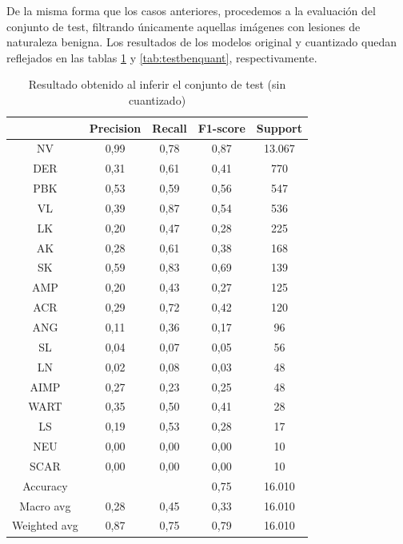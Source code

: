 De la misma forma que los casos anteriores, procedemos a la evaluación del conjunto de test, filtrando únicamente aquellas imágenes con lesiones de naturaleza benigna. Los resultados de los modelos original y cuantizado quedan reflejados en las tablas \ref{tab:testbenorig} y \ref{tab:testbenquant}, respectivamente.

\begin{table}[!ht]
	\centering
	\begin{tabular}{|c|c|c|c|c|}
		\hline
		~ & Precision & Recall & F1-score & Support \\ \hline
		NV & 0,99 & 0,78 & 0,87 & 13.067 \\ 
		DER & 0,31 & 0,61 & 0,41 & 770 \\ 
		PBK & 0,53 & 0,59 & 0,56 & 547 \\ 
		VL & 0,39 & 0,87 & 0,54 & 536 \\ 
		LK & 0,20 & 0,47 & 0,28 & 225 \\ 
		AK & 0,28 & 0,61 & 0,38 & 168 \\ 
		SK & 0,59 & 0,83 & 0,69 & 139 \\ 
		AMP & 0,20 & 0,43 & 0,27 & 125 \\ 
		ACR & 0,29 & 0,72 & 0,42 & 120 \\ 
		ANG & 0,11 & 0,36 & 0,17 & 96 \\ 
		SL & 0,04 & 0,07 & 0,05 & 56 \\ 
		LN & 0,02 & 0,08 & 0,03 & 48 \\ 
		AIMP & 0,27 & 0,23 & 0,25 & 48 \\ 
		WART & 0,35 & 0,50 & 0,41 & 28 \\ 
		LS & 0,19 & 0,53 & 0,28 & 17 \\ 
		NEU & 0,00 & 0,00 & 0,00 & 10 \\ 
		SCAR & 0,00 & 0,00 & 0,00 & 10 \\ \hline
		Accuracy & ~ & ~ & 0,75 & 16.010 \\ \hline
		Macro avg & 0,28 & 0,45 & 0,33 & 16.010 \\ 
		Weighted avg & 0,87 & 0,75 & 0,79 & 16.010 \\ \hline
	\end{tabular}
	\caption{Resultado obtenido al inferir el conjunto de test (sin cuantizado)}
	\label{tab:testbenorig}
\end{table}

